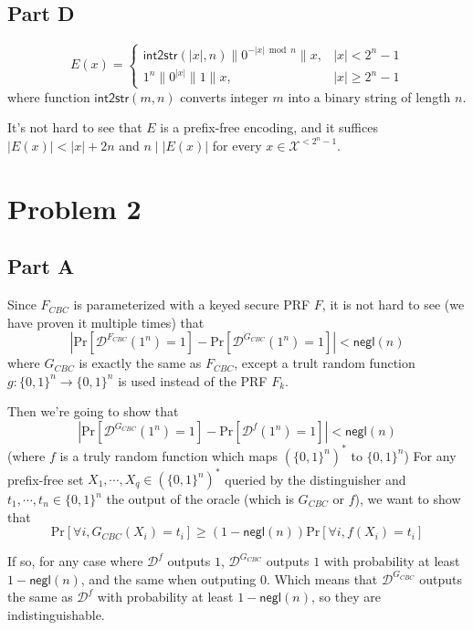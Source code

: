 \documentclass[8pt]{article}
\theoremstyle{compact}
\def\ge{\geqslant}
\begin{document}
\subsection*{Part D}
$$E(x) = \begin{cases}
	\textsf{int2str}(|x|, n) \| 0^{-|x| \bmod n} \| x, & |x| < 2^n - 1 \\
	1^n \| 0^{|x|} \| 1 \| x, & |x| \ge 2^n - 1
\end{cases}$$
where function $\textsf{int2str}(m, n)$ converts integer $m$ into a binary string of length $n$.

It's not hard to see that $E$ is a prefix-free encoding, and it suffices $|E(x)| < |x| + 2n$ and $n \mid |E(x)|$ for every $x \in \mathcal X^{< 2^n-1}$.

\section*{Problem 2}
\subsection*{Part A}
Since $F_{CBC}$ is parameterized with a keyed secure PRF $F$, it is not hard to see (we have proven it multiple times) that $$\left| \text{Pr}\left[\mathcal D^{F_{CBC}}(1^n) = 1\right] - \text{Pr}\left[\mathcal D^{G_{CBC}}(1^n) = 1\right] \right| < \textsf{negl}(n)$$
where $G_{CBC}$ is exactly the same as $F_{CBC}$, except a trult random function $g: \{0, 1\}^n \to \{0, 1\}^n$ is used instead of the PRF $F_k$.

Then we're going to show that $$\left| \text{Pr}\left[\mathcal D^{G_{CBC}}(1^n) = 1\right] - \text{Pr}\left[\mathcal D^{f}(1^n) = 1\right] \right| < \textsf{negl}(n)$$
(where $f$ is a truly random function which maps $(\{0, 1\}^n)^*$ to $\{0, 1\}^n$) For any prefix-free set $X_1, \cdots, X_q \in (\{0, 1\}^{n})^{*}$ queried by the distinguisher and $t_1, \cdots, t_n \in \{0, 1\}^n$ the output of the oracle (which is $G_{CBC}$ or $f$), we want to show that \begin{equation}
	\text{Pr}\left[\forall i, G_{CBC}(X_i) = t_i\right] \ge (1 - \textsf{negl}(n))\text{Pr}\left[\forall i, f(X_i) = t_i\right]
	\label{lalala}
\end{equation}

If so, for any case where $\mathcal D^{f}$ outputs $1$, $\mathcal D^{G_{CBC}}$ outputs $1$ with probability at least $1 - \textsf{negl}(n)$, and the same when outputing $0$. Which means that $\mathcal D^{G_{CBC}}$ outputs the same as $\mathcal D^{f}$ with probability at least $1 - \textsf{negl}(n)$, so they are indistinguishable.
\end{document}
